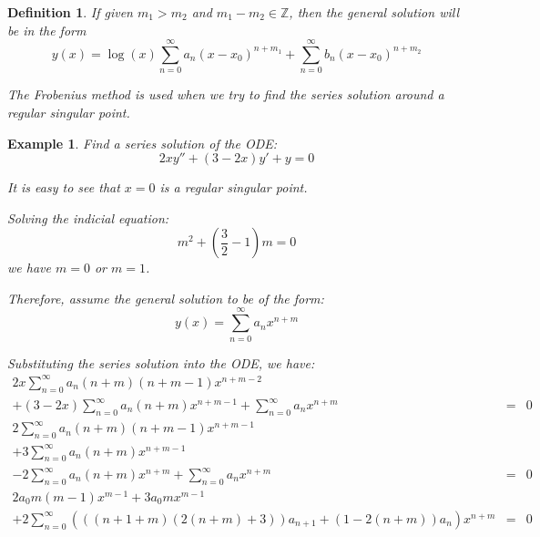 \documentclass{article}
\newtheorem{definition}{Definition}[section]
\newtheorem{example}{Example}[section]
\begin{document}
\begin{enumerate}
\begin{definition}
              If given $m_{1} > m_{2} $ and $m_{1} - m_{2} \in \mathbb{Z}$,
              then the general solution will be in the form
              \begin{equation}
                  y(x) = \log(x) \sum_{n=0}^{\infty} a_n (x - x_0)^{n+m_{1}}
                  + \sum_{n=0}^{\infty} b_n (x - x_0)^{n+m_{2}}
              \end{equation}

              The Frobenius method is used when we try to find the series solution
              around a regular singular point.
          \end{definition}
          \begin{example}
              Find a series solution of the ODE:
              \begin{equation}
                  2x y'' + (3-2x) y' + y = 0
              \end{equation}

              It is easy to see that $x = 0$ is a regular singular point.

              Solving the indicial equation:
              \begin{equation}
                  m^2 + (\frac{3}{2}-1) m = 0
              \end{equation}
              we have $m = 0$ or $m = 1$.

              Therefore, assume the general solution to be of the form:
              \begin{equation}
                  y(x) = \sum_{n=0}^{\infty} a_n x^{n+m}
              \end{equation}

              Substituting the series solution into the ODE,
              we have:
              \begin{eqnarray}
                  2x \sum_{n=0}^{\infty} a_n (n+m)(n+m-1) x^{n+m-2} && \\
                  + (3-2x) \sum_{n=0}^{\infty} a_n (n+m) x^{n+m-1}
                  + \sum_{n=0}^{\infty} a_n x^{n+m}
                  &=& 0 \\
                  2 \sum_{n=0}^{\infty} a_n (n+m)(n+m-1) x^{n+m-1} && \\
                  + 3 \sum_{n=0}^{\infty} a_n (n+m) x^{n+m-1} && \\
                  - 2 \sum_{n=0}^{\infty} a_n (n+m) x^{n+m}
                  + \sum_{n=0}^{\infty} a_n x^{n+m}
                  &=& 0 \\
                  2a_{0} m (m-1) x^{m-1} + 3a_{0} m x^{m-1} && \\
                  + 2 \sum_{n=0}^{\infty} \left(
                  \left(
                  (n + 1 + m)(2(n + m) + 3)
                  \right) a_{n + 1}
                  + \left(
                  1 - 2(n + m)
                  \right) a_{n} \right) x^{n+m}
                  &=& 0
              \end{eqnarray}


\end{example}
\end{enumerate}
\end{document}
